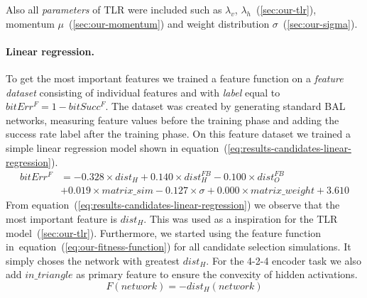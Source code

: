 Also all \emph{parameters} of TLR were included such as $\lambda_v$, $\lambda_h$~(\ref{sec:our-tlr}), momentum $\mu$~(\ref{sec:our-momentum}) and weight distribution $\sigma$~(\ref{sec:our-sigma}). 

\paragraph{Linear regression.}
To get the most important features we trained a feature function on a \emph{feature dataset} consisting of individual features and with \emph{label} equal to $bitErr^F = 1-bitSucc^F$. The dataset was created by generating standard BAL networks, measuring feature values before the training phase and adding the success rate label after the training phase. On this feature dataset we trained a simple linear regression model shown in equation~(\ref{eq:results-candidates-linear-regression}).
\begin{align} 
\label{eq:results-candidates-linear-regression} 
bitErr^F &= 
- 0.328 \times dist_{H}
+ 0.140 \times dist_{H}^{FB}
- 0.100 \times dist_{O}^{FB} \nonumber \\
&+ 0.019 \times matrix\_sim
- 0.127 \times \sigma
+ 0.000 \times matrix\_weight
+ 3.610
\end{align}  
From equation~(\ref{eq:results-candidates-linear-regression}) we observe that the most important feature is $dist_{H}$. This was used as a inspiration for the TLR model~(\ref{sec:our-tlr}). Furthermore, we started using the feature function in~equation~(\ref{eq:our-fitness-function}) for all candidate selection simulations. It simply choses the network with greatest $dist_{H}$. For the 4-2-4 encoder task we also add $in\_triangle$ as primary feature to ensure the convexity of hidden activations. 
\begin{equation} 
\label{eq:our-fitness-function} 
  F(network) = -dist_{H}(network)
\end{equation} 




